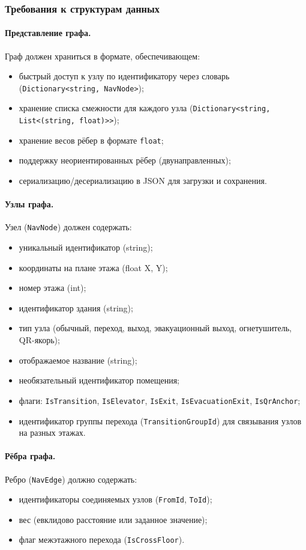 \subsubsection{Требования к структурам данных}

\paragraph{Представление графа.} Граф должен храниться в формате, обеспечивающем:
\begin{itemize}
\item быстрый доступ к узлу по идентификатору через словарь (\texttt{Dictionary<string, NavNode>});
\item хранение списка смежности для каждого узла (\texttt{Dictionary<string, List<(string, float)>>});
\item хранение весов рёбер в формате \texttt{float};
\item поддержку неориентированных рёбер (двунаправленных);
\item сериализацию/десериализацию в JSON для загрузки и сохранения.
\end{itemize}

\paragraph{Узлы графа.} Узел (\texttt{NavNode}) должен содержать:
\begin{itemize}
\item уникальный идентификатор (string);
\item координаты на плане этажа (float X, Y);
\item номер этажа (int);
\item идентификатор здания (string);
\item тип узла (обычный, переход, выход, эвакуационный выход, огнетушитель, QR-якорь);
\item отображаемое название (string);
\item необязательный идентификатор помещения;
\item флаги: \texttt{IsTransition}, \texttt{IsElevator}, \texttt{IsExit}, \texttt{IsEvacuationExit}, \texttt{IsQrAnchor};
\item идентификатор группы перехода (\texttt{TransitionGroupId}) для связывания узлов на разных этажах.
\end{itemize}

\paragraph{Рёбра графа.} Ребро (\texttt{NavEdge}) должно содержать:
\begin{itemize}
\item идентификаторы соединяемых узлов (\texttt{FromId}, \texttt{ToId});
\item вес (евклидово расстояние или заданное значение);
\item флаг межэтажного перехода (\texttt{IsCrossFloor}).
\end{itemize}

